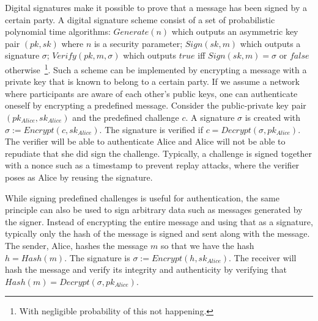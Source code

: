 Digital signatures make it possible to prove that a message has been signed by a certain party. A digital signature scheme consist of a set of probabilistic polynomial time algorithms: $Generate(n)$ which outputs an asymmetric key pair $(pk, sk)$ where $n$ is a security parameter; $Sign(sk, m)$ which outputs a signature $\sigma$; $Verify(pk, m, \sigma)$ which outputs $true$ iff $Sign(sk, m) = \sigma$ or $false$ otherwise~\footnote{With negligible probability of this not happening.}. Such a scheme can be implemented by encrypting a message with a private key that is known to belong to a certain party. If we assume a network where participants are aware of each other's public keys, one can authenticate oneself by encrypting a predefined message. Consider the public-private key pair $(pk_{Alice}, sk_{Alice})$ and the predefined challenge $c$. A signature $\sigma$ is created with $\sigma := Encrypt(c, sk_{Alice})$. The signature is verified if $c=Decrypt(\sigma, pk_{Alice})$. The verifier will be able to authenticate Alice and Alice will not be able to repudiate that she did sign the challenge. Typically, a challenge is signed together with a nonce such as a timestamp to prevent replay attacks, where the verifier poses as Alice by reusing the signature.

While signing predefined challenges is useful for authentication, the same principle can also be used to sign arbitrary data such as messages generated by the signer. Instead of encrypting the entire message and using that as a signature, typically only the hash of the message is signed and sent along with the message. The sender, Alice, hashes the message $m$ so that we have the hash $h=Hash(m)$. The signature is $\sigma := Encrypt(h, sk_{Alice})$. The receiver will hash the message and verify its integrity and authenticity by verifying that $Hash(m)=Decrypt(\sigma, pk_{Alice})$.
